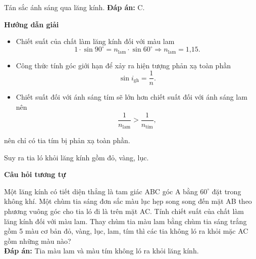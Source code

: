 \begin{dang}{Tán sắc ánh sáng qua lăng kính.}
{	\textbf{Đáp án:} C.
	}
	
	{	\begin{center}
			\textbf{Hướng dẫn giải}
		\end{center}
		
	\begin{itemize}
\item Chiết suất của chất làm lăng kính đối với màu lam
\begin{equation*}
	1 \cdot \sin 90^\circ = n_{\text{lam}} \cdot \sin 60^\circ \Rightarrow n_{\text{lam}}=\text{1,15}.
\end{equation*}
\item Công thức tính góc giới hạn để xảy ra hiện tượng phản xạ toàn phần
\begin{equation*}
	\sin i_{\text{gh}}=\dfrac{1}{n}.
\end{equation*}
\item Chiết suất đối với ánh sáng tím sẽ lớn hơn chiết suất đối với ánh sáng lam nên 
 \begin{equation*}
 	\dfrac{1}{n_{\text{lam}}}>\dfrac{1}{n_{\text{tím}}},
 \end{equation*}
\end{itemize}

nên chỉ có tia tím bị phản xạ toàn phần.

Suy ra tia ló khỏi lăng kính gồm đỏ, vàng, lục.
		
	\begin{center}
	\textbf{Câu hỏi tương tự}
	\end{center}

Một lăng kính có tiết diện thẳng là tam giác ABC góc A bằng $60^\circ$ đặt trong không khí. Một chùm tia sáng đơn sắc màu lục hẹp song song đến mặt AB theo phương vuông góc cho tia ló đi là trên mặt AC. Tính chiết suất của chất làm lăng kính đối với màu lam. Thay chùm tia màu lam bằng chùm tia sáng trắng gồm 5 màu cơ bản đỏ, vàng, lục, lam, tím thì các tia không ló ra khỏi mặc AC gồm những màu nào? \\

	\textbf{Đáp án:} Tia màu lam và màu tím không ló ra khỏi lăng kính.
	}
\end{dang}